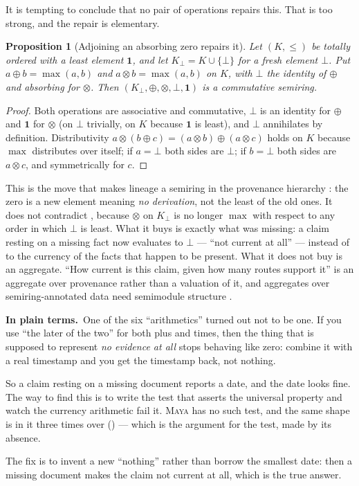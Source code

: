 \documentclass[11pt,a4paper]{article}
\renewcommand{\_}{\oldunderscore\allowbreak}
\theoremstyle{plain}
\newtheorem{proposition}[theorem]{Proposition}
\theoremstyle{definition}
\theoremstyle{definition}
\theoremstyle{remark}
\newcommand{\pt}{\textbf{In plain terms.}\ }
\begin{document}
It is tempting to conclude that no pair of operations repairs this. That is too strong, and the repair is
elementary.

\begin{proposition}[Adjoining an absorbing zero repairs it]\label{prop:adjoin}
Let $(K,\le)$ be totally ordered with a least element $\mathbf{1}$, and let $K_\bot = K \cup \{\bot\}$ for a
fresh element $\bot$. Put $a \oplus b = \max(a,b)$ and $a \otimes b = \max(a,b)$ on $K$, with $\bot$ the
identity of $\oplus$ and absorbing for $\otimes$. Then $(K_\bot, \oplus, \otimes, \bot, \mathbf{1})$ is a
commutative semiring.
\end{proposition}

\begin{proof}
Both operations are associative and commutative, $\bot$ is an identity for $\oplus$ and $\mathbf{1}$ for
$\otimes$ (on $\bot$ trivially, on $K$ because $\mathbf{1}$ is least), and $\bot$ annihilates by
definition. Distributivity $a \otimes (b \oplus c) = (a \otimes b) \oplus (a \otimes c)$ holds on $K$
because $\max$ distributes over itself; if $a = \bot$ both sides are $\bot$; if $b = \bot$ both sides are
$a \otimes c$, and symmetrically for $c$.
\end{proof}

This is the move that makes lineage a semiring in the provenance hierarchy \cite{greentannen2017}: the
zero is a new element meaning \emph{no derivation}, not the least of the old ones. It does not contradict
, because $\otimes$ on $K_\bot$ is no longer $\max$ with respect to any order in which
$\bot$ is least. What it buys is exactly what was missing: a claim resting on a missing fact now evaluates
to $\bot$ --- ``not current at all'' --- instead of to the currency of the facts that happen to be present.
What it does not buy is an aggregate. ``How current is this claim, given how many routes support it'' is an
aggregate over provenance rather than a valuation of it, and aggregates over semiring-annotated data need
semimodule structure \cite{amsterdamer2011}.

\begin{plain}
\pt One of the six ``arithmetics'' turned out not to be one. If you use ``the later of the two'' for both
plus and times, then the thing that is supposed to represent \emph{no evidence at all} stops behaving like
zero: combine it with a real timestamp and you get the timestamp back, not nothing.

So a claim resting on a missing document reports a date, and the date looks fine. The way to find this is
to write the test that asserts the universal property and watch the currency arithmetic fail it.
\textsc{Maya} has no such test, and the same shape is in it three times over () ---
which is the argument for the test, made by its absence.

The fix is to invent a new ``nothing'' rather than borrow the smallest date: then a missing document makes
the claim not current at all, which is the true answer.
\end{plain}
\end{document}
